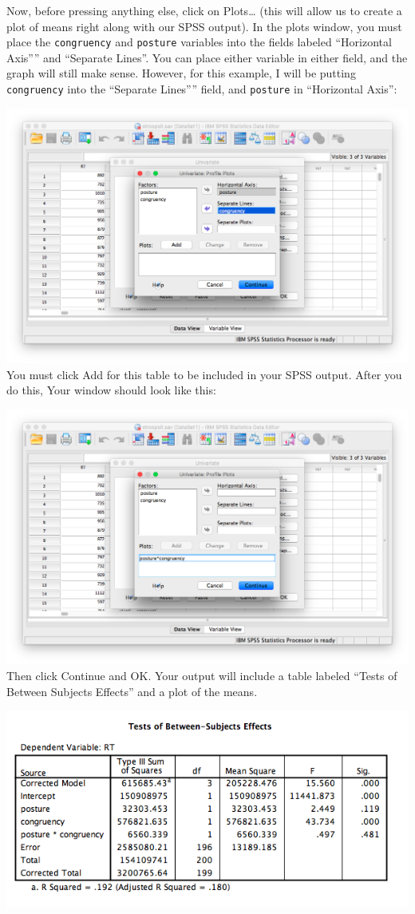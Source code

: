\documentclass[
]{book}
\begin{document}
Now, before pressing anything else, click on {Plots\ldots{}} (this will allow us to create a plot of means right along with our SPSS output). In the plots window, you must place the \texttt{congruency} and \texttt{posture} variables into the fields labeled ``Horizontal Axis'''' and ``Separate Lines''. You can place either variable in either field, and the graph will still make sense. However, for this example, I will be putting \texttt{congruency} into the ``Separate Lines'''' field, and \texttt{posture} in ``Horizontal Axis'':

\includegraphics{img/10.4.14.png}
You must click {Add} for this table to be included in your SPSS output. After you do this, Your window should look like this:

\includegraphics{img/10.4.15.png}
Then click {Continue} and {OK}. Your output will include a table labeled ``Tests of Between Subjects Effects'' and a plot of the means.

\includegraphics{img/10.4.16.png}
\end{document}
